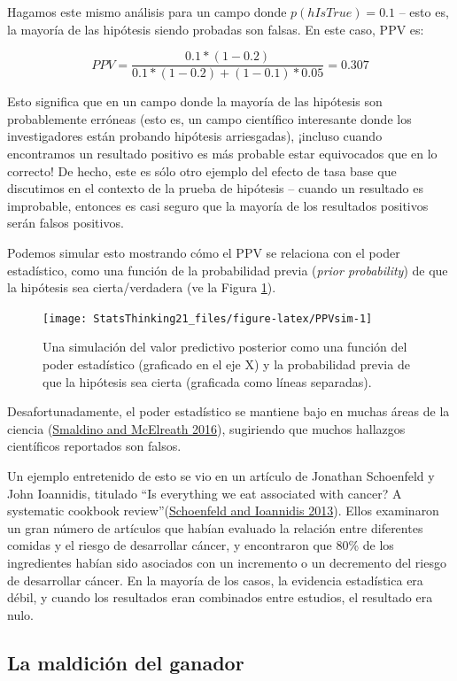 \documentclass[
  12pt,
]{book}
\begin{document}
Hagamos este mismo análisis para un campo donde \(p(hIsTrue)=0.1\) -- esto es, la mayoría de las hipótesis siendo probadas son falsas. En este caso, PPV es:

\[
PPV = \frac{0.1 * (1 - 0.2)}{0.1 * (1 - 0.2) + (1 - 0.1) * 0.05} = 0.307
\]

Esto significa que en un campo donde la mayoría de las hipótesis son probablemente erróneas (esto es, un campo científico interesante donde los investigadores están probando hipótesis arriesgadas), ¡incluso cuando encontramos un resultado positivo es más probable estar equivocados que en lo correcto! De hecho, este es sólo otro ejemplo del efecto de tasa base que discutimos en el contexto de la prueba de hipótesis -- cuando un resultado es improbable, entonces es casi seguro que la mayoría de los resultados positivos serán falsos positivos.

Podemos simular esto mostrando cómo el PPV se relaciona con el poder estadístico, como una función de la probabilidad previa (\emph{prior probability}) de que la hipótesis sea cierta/verdadera (ve la Figura \ref{fig:PPVsim}).

\begin{figure}
\texttt{[image: StatsThinking21\_files/figure-latex/PPVsim-1]} \caption{Una simulación del valor predictivo posterior como una función del poder estadístico (graficado en el eje X) y la probabilidad previa de que la hipótesis sea cierta (graficada como líneas separadas).}\label{fig:PPVsim}
\end{figure}

Desafortunadamente, el poder estadístico se mantiene bajo en muchas áreas de la ciencia (\protect\hyperlink{ref-smal:mcel:2016}{Smaldino and McElreath 2016}), sugiriendo que muchos hallazgos científicos reportados son falsos.

Un ejemplo entretenido de esto se vio en un artículo de Jonathan Schoenfeld y John Ioannidis, titulado ``Is everything we eat associated with cancer? A systematic cookbook review''(\protect\hyperlink{ref-scho:ioan:2013}{Schoenfeld and Ioannidis 2013}). Ellos examinaron un gran número de artículos que habían evaluado la relación entre diferentes comidas y el riesgo de desarrollar cáncer, y encontraron que 80\% de los ingredientes habían sido asociados con un incremento o un decremento del riesgo de desarrollar cáncer. En la mayoría de los casos, la evidencia estadística era débil, y cuando los resultados eran combinados entre estudios, el resultado era nulo.

\hypertarget{la-maldiciuxf3n-del-ganador}{%
\subsection{La maldición del ganador}\label{la-maldiciuxf3n-del-ganador}}
\end{document}
